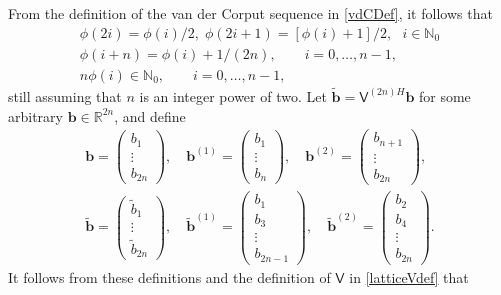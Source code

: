 \documentclass[twocolumn]{svjour3}          %
\newcommand{\bm}[1]{\boldsymbol{#1}}
\newcommand{\natzero}{\mathbb{N}_0}
\newcommand{\reals}{\mathbb{R}}
\newcommand{\vb}{\bm{b}}
\newcommand{\mV}{\mathsf{V}}
\begin{document}
From the definition of the van der Corput sequence in \eqref{vdCDef}, it follows that
\begin{gather} 
\label{vdCProp}
\phi(2i) = \phi(i)/2, \;  \phi(2i+1) = [\phi(i)+1]/2, \ \ \ i \in \natzero\\
\label{vdCPropB}
\phi(i+n) = \phi(i) + 1/(2n), \qquad i = 0, \ldots, n-1,
\\
\label{vdCPropC}
n \phi(i) \in \natzero, \qquad i = 0, \ldots, n-1,
\end{gather}
still assuming that $n$ is an integer power of two.
Let $\widetilde{\vb} = \mV^{(2n)H}\vb$ for some arbitrary $\vb \in \reals^{2n}$, and define
\begin{gather*}
\vb = \begin{pmatrix} b_1 \\ \vdots \\ b_{2n} \end{pmatrix}, \quad 
\vb^{(1)} = \begin{pmatrix} b_1 \\ \vdots \\ b_{n} \end{pmatrix}, \quad 
\vb^{(2)}  = \begin{pmatrix} b_{n+1} \\ \vdots \\ b_{2n} \end{pmatrix}, \\ 
\widetilde{\vb} = \begin{pmatrix} \widetilde{b}_1 \\ \vdots \\ \widetilde{b}_{2n} \end{pmatrix}, \quad 
\widetilde{\vb}^{(1)} = \begin{pmatrix} b_1 \\ b_3 \\ \vdots \\ b_{2n-1} \end{pmatrix}, \quad 
\widetilde{\vb}^{(2)}  = \begin{pmatrix} b_{2} \\  b_{4} \\ \vdots \\ b_{2n} \end{pmatrix}. 
\end{gather*}
It follows from these definitions and the definition of $\mV$ in  \eqref{latticeVdef} that
\end{document}
